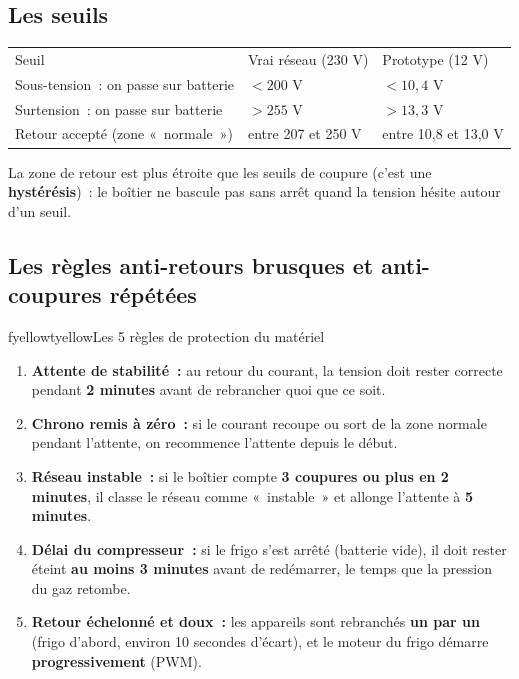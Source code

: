 \documentclass[10pt,a4paper]{article}
\begin{document}
\subsection{Les seuils}
\begin{tabularx}{\linewidth}{Q{4.6cm}LL}
 Seuil & \mdseries Vrai réseau (230 V) & \mdseries Prototype (12 V) \\
Sous-tension~: on passe sur batterie & $< 200$ V & $< 10{,}4$ V \\
Surtension~: on passe sur batterie & $> 255$ V & $> 13{,}3$ V \\
Retour accepté (zone «~normale~») & entre 207 et 250 V & entre 10,8 et 13,0 V \\
\end{tabularx}

{\small La zone de retour est plus étroite que les seuils de coupure (c'est une \textbf{hystérésis})~: le boîtier ne bascule pas sans arrêt quand la tension hésite autour d'un seuil.}

\subsection{Les règles anti-retours brusques et anti-coupures répétées}
\begin{tbox}{fyellow}{tyellow}{Les 5 règles de protection du matériel}
\begin{enumerate}[leftmargin=2em, itemsep=0.3em]
  \item \textbf{Attente de stabilité~:} au retour du courant, la tension doit rester correcte pendant \textbf{2 minutes} avant de rebrancher quoi que ce soit.
  \item \textbf{Chrono remis à zéro~:} si le courant recoupe ou sort de la zone normale pendant l'attente, on recommence l'attente depuis le début.
  \item \textbf{Réseau instable~:} si le boîtier compte \textbf{3 coupures ou plus en 2 minutes}, il classe le réseau comme «~instable~» et allonge l'attente à \textbf{5 minutes}.
  \item \textbf{Délai du compresseur~:} si le frigo s'est arrêté (batterie vide), il doit rester éteint \textbf{au moins 3 minutes} avant de redémarrer, le temps que la pression du gaz retombe.
  \item \textbf{Retour échelonné et doux~:} les appareils sont rebranchés \textbf{un par un} (frigo d'abord, environ 10 secondes d'écart), et le moteur du frigo démarre \textbf{progressivement} (PWM).
\end{enumerate}
\end{tbox}
\end{document}
